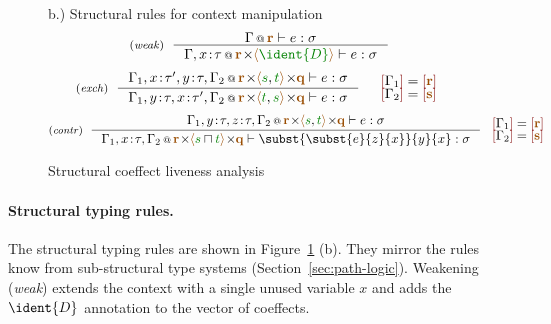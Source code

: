 \begin{figure}[t]
{\small b.) Structural rules for context manipulation}
\begin{equation*}
\tyrule{weak}
  {\coctx{\Gamma}{ \aclrd{\textbf{r}} } \vdash e : \sigma}
  {\coctx{\Gamma,x \!:\! \tau}{\aclrd{\textbf{r}} \cons \alift{ \cclrd{\ident{D}} }} \vdash e : \sigma} 
\end{equation*}
\begin{equation*}
\tyrule{exch}
  {\coctx{\Gamma_1,x\!:\!\tau',y\!:\!\tau,\Gamma_2}{\aclrd{\textbf{r}} \cons\alift{\cclrd{s},\cclrd{t}} \cons \aclrd{\textbf{q}}} \vdash e : \sigma}
  {\coctx{\Gamma_1,y\!:\!\tau,x\!:\!\tau',\Gamma_2}{\aclrd{\textbf{r}} \cons\alift{\cclrd{t},\cclrd{s}} \cons \aclrd{\textbf{q}}} \vdash e : \sigma}
\quad
\begin{array}{l}
\slift{\Gamma_1} = \slift{\aclrd{\textbf{r}}}\\[-0.25em]
\slift{\Gamma_2} = \slift{\aclrd{\textbf{s}}}
\end{array}
\end{equation*}
\begin{equation*}
\tyrule{contr}
  {\coctx{\Gamma_1,y\!:\!\tau,z\!:\!\tau,\Gamma_2}{\aclrd{\textbf{r}} \cons \alift{\cclrd{s},\cclrd{t}} \cons \aclrd{\textbf{q}}} \vdash e : \sigma}
  {\coctx{\Gamma_1,x\!:\!\tau,\Gamma_2}{\aclrd{\textbf{r}} \cons \alift{\cclrd{s}\sqcap\cclrd{t}} \cons \aclrd{\textbf{q}}} \vdash \subst{\subst{e}{z}{x}}{y}{x} : \sigma}
~
\begin{array}{l}
\slift{\Gamma_1} = \slift{\aclrd{\textbf{r}}}\\[-0.25em]
\slift{\Gamma_2} = \slift{\aclrd{\textbf{s}}}
\end{array}
\end{equation*}

\caption{Structural coeffect liveness analysis}
\label{fig:applications-struct-live}
\vspace{-1em}
\end{figure}


\paragraph{Structural typing rules.}
The structural typing rules are shown in Figure~\ref{fig:applications-struct-live} (b). They mirror
the rules know from sub-structural type systems (Section~\ref{sec:path-logic}). Weakening (\emph{weak})
extends the context with a single unused variable $x$ and adds the $\ident{D}$ annotation to the
vector of coeffects.

